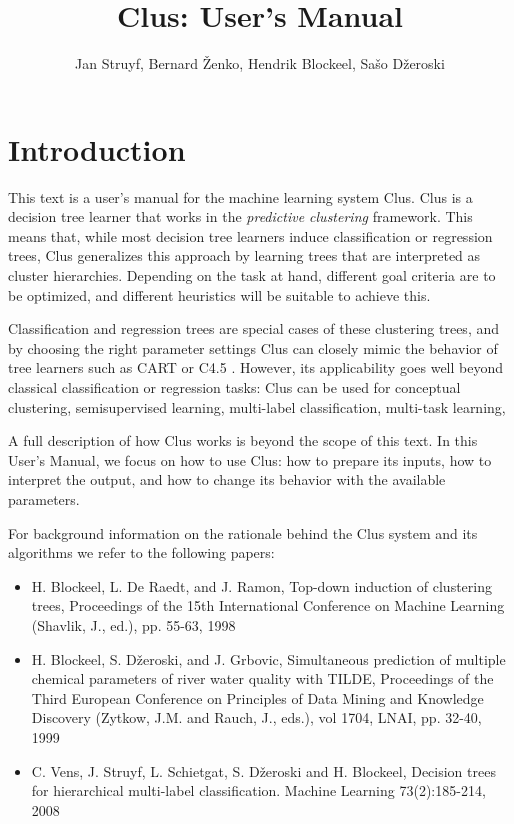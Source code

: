 \documentclass[a4paper]{report}
\begin{document}
\title{Clus: User's Manual}

\author{Jan Struyf, Bernard \v{Z}enko, Hendrik Blockeel, Sa\v{s}o D\v{z}eroski}

\maketitle



\tableofcontents



\chapter{Introduction}



This text is a user's manual for the machine learning system Clus.
Clus is a decision tree learner that works in the {\em predictive clustering} framework.
This means that, while most decision tree learners induce classification or regression trees,
Clus generalizes this approach by learning trees that are interpreted as cluster
hierarchies.  Depending on the task at hand, different goal criteria are to be optimized, and different heuristics will be suitable to achieve this.

Classification and regression trees are special cases of these clustering trees, and by choosing the right parameter settings Clus can closely mimic the behavior of tree learners such as CART \cite{Breiman84:other} or C4.5 \cite{Quinlan83:other}.  However, its applicability goes well beyond classical classification or regression tasks: Clus can be used for conceptual clustering, semisupervised learning, multi-label classification, multi-task learning, 

A full description of how Clus works is beyond the scope of this text.  In this User's Manual, we focus on how to use Clus: how to prepare its inputs, how to interpret the output, and how to change its behavior with the available parameters.

For background information on the rationale behind the Clus system and its algorithms we refer to the following papers:

\begin{itemize}

\item H. Blockeel, L. De Raedt, and J. Ramon, Top-down induction of clustering trees, Proceedings of the 15th International Conference on Machine Learning (Shavlik, J., ed.), pp. 55-63, 1998

\item H. Blockeel, S. D\v zeroski, and J. Grbovic, Simultaneous prediction of multiple chemical parameters of river water quality with TILDE, Proceedings of the Third European Conference on Principles of Data Mining and Knowledge Discovery (Zytkow, J.M. and Rauch, J., eds.), vol 1704, LNAI, pp. 32-40, 1999

\item  C. Vens, J. Struyf, L. Schietgat, S. D\v zeroski and H. Blockeel, Decision trees for hierarchical multi-label classification. Machine Learning 73(2):185-214, 2008

\end{itemize}
\end{document}
